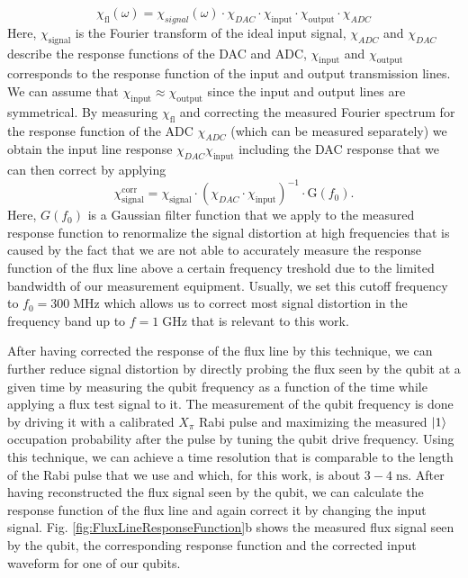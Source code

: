 %
\begin{equation}
\chi_{\mathrm{fl}}(\omega) = \chi_{signal}(\omega)\cdot \chi_{DAC}\cdot \chi_{\mathrm{input}} \cdot \chi_{\mathrm{output}}\cdot\chi_{ADC} \label{eq:flux_response}
\end{equation}
%
Here, $\chi_{\mathrm{signal}}$ is the Fourier transform of the ideal input signal, $\chi_{ADC}$ and $\chi_{DAC}$ describe the response functions of the DAC and ADC, $\chi_{\mathrm{input}}$ and $\chi_{\mathrm{output}}$ corresponds to the response function of the input and output transmission lines. We can assume that $\chi_{\mathrm{input}}\approx\chi_{\mathrm{output}}$ since the input and output lines are symmetrical. By measuring $\chi_{\mathrm{fl}}$ and correcting the measured Fourier spectrum for the response function of the ADC $\chi_{ADC}$ (which can be measured separately) we obtain the input line response $\chi_{DAC}\chi_{\mathrm{input}}$ including the DAC response that we can then correct by applying
%
\begin{equation}
\chi_{\mathrm{signal}}^{\mathrm{corr}} = \chi_{\mathrm{signal}}\cdot (\chi_{DAC}\cdot\chi_{\mathrm{input}})^{-1}\cdot \mathrm{G}(f_0).
\end{equation}
%
Here, $G(f_0)$ is a Gaussian filter function that we apply to the measured response function to renormalize the signal distortion at high frequencies that is caused by the fact that we are not able to accurately measure the response function of the flux line above a certain frequency treshold due to the limited bandwidth of our measurement equipment. Usually, we set this cutoff frequency to $f_0=300\;\mathrm{MHz}$ which allows us to correct most signal distortion in the frequency band up to $f=1\;\mathrm{GHz}$ that is relevant to this work.

\smallskip

After having corrected the response of the flux line by this technique, we can further reduce signal distortion by directly probing the flux seen by the qubit at a given time by measuring the qubit frequency as a function of the time while applying a flux test signal to it. The measurement of the qubit frequency is done by driving it with a calibrated $X_\pi$ Rabi pulse and maximizing the measured $\left| 1 \right>$ occupation probability after the pulse by tuning the qubit drive frequency. Using this technique, we can achieve a time resolution that is comparable to the length of the Rabi pulse that we use and which, for this work, is about $3-4\;\mathrm{ns}$. After having reconstructed the flux signal seen by the qubit, we can calculate the response function of the flux line and again correct it by changing the input signal. Fig. \ref{fig:FluxLineResponseFunction}b shows the measured flux signal seen by the qubit, the corresponding response function and the corrected input waveform for one of our qubits.


